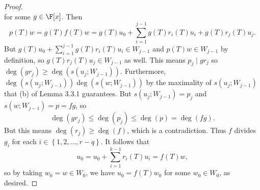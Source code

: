 \documentclass[linearalgebraII]{subfiles}
\begin{document}
\begin{proof}
\begin{equation*}
        \end{equation*}
        for some $g\in\F[x]$. Then
        \begin{equation*}
            p(T)w = g(T)f(T)w = g(T)u_0 + \sum^{j-1}_{i=1} g(T)r_i(T)u_i + g(T)r_j(T)u_j.
        \end{equation*}
        But $g(T)u_0+\sum^{j-1}_{i=1} g(T)r_i(T)u_i\in W_{j-1}$ and $p(T)w\in W_{j-1}$ by definition, so $g(T)r_j(T)u_j\in W_{j-1}$ as well. This means $p_j\mid gr_j$ so $\deg\left( gr_j \right) \geq \deg\left( s\left( u_j;W_{j-1} \right) \right)$. Furthermore, $\deg\left( s\left( u_j;W_{j-1} \right)  \right) \deg\left( s\left( w;W_{j-1} \right)  \right)$ by the maximality of $s\left( u_j;W_{j-1} \right) $ that (b) of Lemma 3.3.1 guarantees. But $s\left( u_j;W_{j-1} \right) = p_j$ and $s\left( w;W_{j-1} \right) = p = fg$, so
        \begin{equation*}
            \deg\left( gr_j \right) \leq \deg\left( p_j \right) \leq \deg(p) = \deg(fg).
        \end{equation*}
        But this means $\deg\left( r_j \right) \geq \deg(f)$, which is a contradiction. Thus $f$ divides $g_i$ for each $i\in\left\lbrace 1,2,\ldots,r-q \right\rbrace $. It follows that
        \begin{equation*}
            u_0 = u_0 + \sum^{k-1}_{i=1} r_i(T)u_i = f(T)w,
        \end{equation*}
        so by taking $w_0=w\in W_0$, we have $u_0 = f(T)w_0$ for some $w_0\in W_0$, as desired.
    \end{proof}

\end{document}
